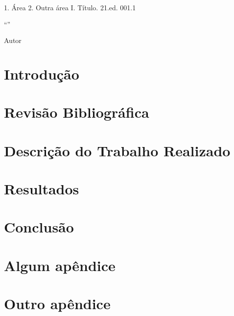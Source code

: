 \documentclass{../ufpatcc}
\begin{document}
  \capa
  \folhaderosto
                     {1. Área 2. Outra área I. Título.}
                     {21.ed. 001.1}
  \begin{dedicatoria}
    \lipsum[13]
  \end{dedicatoria}
  \begin{agradecimentos}
    \lipsum[1-5]
  \end{agradecimentos}
  \begin{epigrafe}
    ``\lipsum*[101]''\par
      Autor
  \end{epigrafe}
  \begin{resumo}
    \lipsum[1]
  \end{resumo}
  \begin{abstract}
    \lipsum[1]
  \end{abstract}
  \tableofcontents

  \chapter{Introdução} %
  \chapter{Revisão Bibliográfica}
    \lipsum[1]\cite{atalholivro}
    \lipsum[2]\cite{atalhoonline}
  \chapter{Descrição do Trabalho Realizado}
  \chapter{Resultados}
  \chapter{Conclusão}

  \appendix
    \chapter{Algum apêndice}
    \chapter{Outro apêndice}

  
\end{document}
